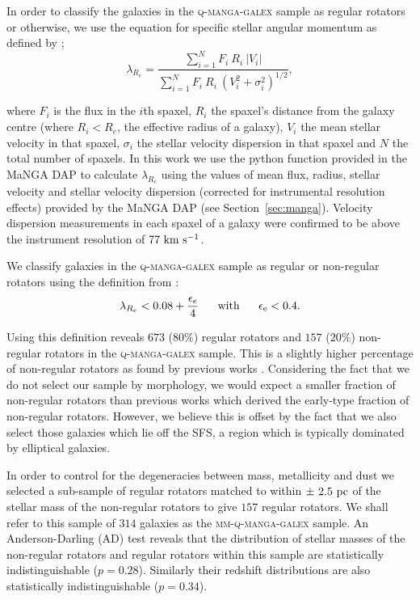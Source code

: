 \documentclass[useAMS,usenatbib]{mn2e}
\begin{document}
In order to classify the galaxies in the \textsc{q-manga-galex} sample as regular rotators or otherwise, we use the equation for specific stellar angular momentum as defined by \cite{emsellem07, emsellem11};
\begin{equation}
\lambda_{R_{e}} = \frac{\sum_{i=1}^{N} F_i\ R_i\ |V_i|}{\sum_{i=1}^{N} F_i\ R_i\ (V_i^2 + \sigma_i^2)^{1/2}},
\end{equation}	

where $F_i$ is the flux in the $i$th spaxel, $R_i$ the spaxel's distance from the galaxy centre (where $R_i < R_e$, the effective radius of a galaxy), $V_i$ the mean stellar velocity in that spaxel, $\sigma_i$ the stellar velocity dispersion in that spaxel and $N$ the total number of spaxels. In this work we use the python function provided in the MaNGA DAP to calculate $\lambda_{R_{e}}$ using the values of mean flux, radius, stellar velocity and stellar velocity dispersion (corrected for instrumental resolution effects) provided  by the MaNGA DAP (see Section~\ref{sec:manga}). Velocity dispersion measurements in each spaxel of a galaxy were confirmed to be above the instrument resolution of $77~\rm{km}~\rm{s}^{-1}$.

We classify galaxies in the \textsc{q-manga-galex} sample as regular or non-regular rotators using the definition from \cite{cappellari16}:
\begin{equation}
\lambda_{R_{e}} < 0.08 + \frac{\epsilon_e}{4} ~~~~~ \rm{with} ~~~~~ \epsilon_e < 0.4.
\end{equation}

Using this definition reveals $673$ ($80\%$) regular rotators and $157$ ($20\%$) non-regular rotators in the \textsc{q-manga-galex} sample. 
This is a slightly higher percentage of non-regular rotators as found by previous works \citep[$14-17\%$ of early-types; ][]{emsellem11, stott16}. Considering the fact that we do not select our sample by morphology, we would expect a smaller fraction of non-regular rotators than previous works which derived the early-type fraction of non-regular rotators. However, we believe this is offset by the fact that we also select those galaxies which lie off the SFS, a region which is typically dominated by elliptical galaxies.   

In order to control for the degeneracies between mass, metallicity and dust we selected a sub-sample of regular rotators matched to within $\pm~2.5~\rm{pc}$ of the stellar mass of the non-regular rotators to give $157$ regular rotators. We shall refer to this sample of $314$ galaxies as the \textsc{mm-q-manga-galex} sample. An Anderson-Darling (AD) test reveals that the distribution of stellar masses of the non-regular rotators and regular rotators within this sample are statistically indistinguishable ($p=0.28$). Similarly their redshift distributions are also statistically indistinguishable ($p=0.34$).
\end{document}
